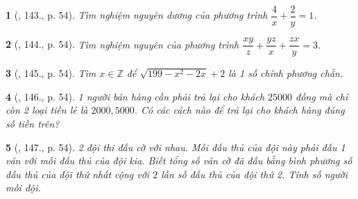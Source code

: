 \documentclass{article}
\newtheorem{baitoan}{}
\begin{document}
\begin{baitoan}[\cite{Tuyen_Toan_9_old}, 143., p. 54]
	Tìm nghiệm nguyên dương của phương trình $\dfrac{4}{x} + \dfrac{2}{y} = 1$.
\end{baitoan}

\begin{baitoan}[\cite{Tuyen_Toan_9_old}, 144., p. 54]
	Tìm nghiệm nguyên của phương trình $\dfrac{xy}{z} + \dfrac{yz}{x} + \dfrac{zx}{y} = 3$.
\end{baitoan}

\begin{baitoan}[\cite{Tuyen_Toan_9_old}, 145., p. 54]
	Tìm $x\in\mathbb{Z}$ để $\sqrt{199 - x^2 - 2x} + 2$ là 1 số chính phương chẵn.
\end{baitoan}

\begin{baitoan}[\cite{Tuyen_Toan_9_old}, 146., p. 54]
	1 người bán hàng cần phải trả lại cho khách $25000$ đồng mà chỉ còn 2 loại tiền lẻ là $2000,5000$. Có các cách nào để trả lại cho khách hàng đúng số tiền trên?
\end{baitoan}

\begin{baitoan}[\cite{Tuyen_Toan_9_old}, 147., p. 54]
	2 đội thi đấu cờ với nhau. Mỗi đấu thủ của đội này phải đấu 1 ván với mỗi đấu thủ của đội kia. Biết tổng số ván cờ đã đấu bằng bình phương số đấu thủ của đội thứ nhất cộng với $2$ lần số đấu thủ của đội thứ 2. Tính số người mỗi đội.
\end{baitoan}

\end{document}
